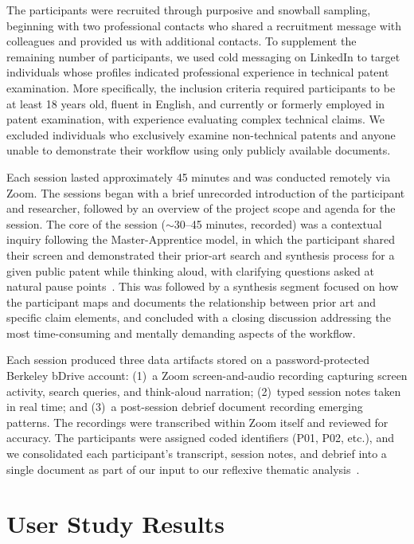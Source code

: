 \documentclass[sigconf]{acmart}
\begin{document}
The participants were recruited through purposive and snowball sampling,
beginning with two professional contacts who shared a recruitment message
with colleagues and provided us with additional contacts. To supplement the
remaining number of participants, we used cold messaging on LinkedIn to target
individuals whose profiles indicated professional experience in technical
patent examination. More specifically, the inclusion criteria required
participants to be at least 18 years old, fluent in English, and currently or
formerly employed in patent examination, with experience evaluating complex
technical claims. We excluded individuals who exclusively examine
non-technical patents and anyone unable to demonstrate their workflow using
only publicly available documents.

Each session lasted approximately 45 minutes and was conducted remotely via
Zoom. The sessions began with a brief unrecorded introduction of the
participant and researcher, followed by an overview of the project scope and
agenda for the session. The core of the session (${\sim}$30--45 minutes,
recorded) was a contextual inquiry following the Master-Apprentice model, in
which the participant shared their screen and demonstrated their prior-art
search and synthesis process for a given public patent while thinking aloud,
with clarifying questions asked at natural pause points~\cite{Beyer1997}.
This was followed by a synthesis segment focused on how the participant maps
and documents the relationship between prior art and specific claim elements,
and concluded with a closing discussion addressing the most time-consuming and
mentally demanding aspects of the workflow.

Each session produced three data artifacts stored on a password-protected
Berkeley bDrive account: (1)~a Zoom screen-and-audio recording capturing
screen activity, search queries, and think-aloud narration; (2)~typed session
notes taken in real time; and (3)~a post-session debrief document recording
emerging patterns. The recordings were transcribed within Zoom itself and
reviewed for accuracy. The participants were assigned coded identifiers (P01,
P02, etc.), and we consolidated each participant's transcript, session notes,
and debrief into a single document as part of our input to our reflexive
thematic analysis~\cite{Braun2006}.


\section{User Study Results}
\end{document}

